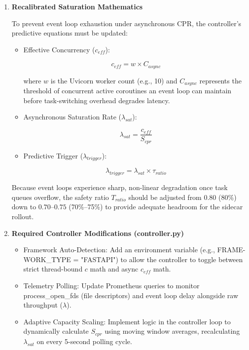 \documentclass{article}
\begin{document}
\begin{enumerate}
	\item \textbf{Recalibrated Saturation Mathematics}
	
	To prevent event loop exhaustion under asynchronous CPR, the controller's predictive equations must be updated:
	\begin{itemize}
		\item Effective Concurrency ($c_{eff}$):
		
		$$c_{eff} = w \times C_{async}$$
		
		where $w$ is the Uvicorn worker count (e.g., 10) and $C_{async}$ represents the threshold of concurrent active coroutines an event loop can maintain before task-switching overhead degrades latency.
		\item Asynchronous Saturation Rate ($\lambda_{sat}$):
		
		$$\lambda_{sat} = \frac{c_{eff}}{S_{cpr}}$$
		\item Predictive Trigger ($\lambda_{trigger}$):
		
		$$\lambda_{trigger} = \lambda_{sat} \times \tau_{ratio}$$
	\end{itemize}
	
	Because event loops experience sharp, non-linear degradation once task queues overflow, the safety ratio $T_{ratio}$ should be adjusted from $0.80$ (80\%) down to $0.70$–$0.75$ (70\%–75\%) to provide adequate headroom for the sidecar rollout.
	
	\item \textbf{Required Controller Modifications (controller.py)}
	
	\begin{itemize}
		\item Framework Auto-Detection: Add an environment variable (e.g., FRAME-WORK\_TYPE = "FASTAPI") to allow the controller to toggle between strict thread-bound $c$ math and async $c_{eff}$ math.
		
		\item Telemetry Polling: Update Prometheus queries to monitor process\_open\_fds (file descriptors) and event loop delay alongside raw throughput ($\lambda$).
		
		\item Adaptive Capacity Scaling: Implement logic in the controller loop to dynamically calculate $S_{cpr}$ using moving window averages, recalculating $\lambda_{sat}$ on every 5-second polling cycle.
	\end{itemize}
\end{enumerate}
\end{document}
